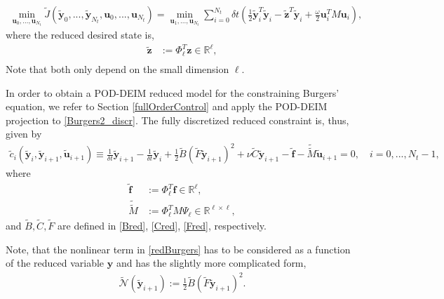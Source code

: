 \begin{align}
\label{redOpt}
\min_{\mathbf{u}_0,...,\mathbf{u}_{N_t}} \tilde{J}(\mathbf{\tilde y}_0,...,\mathbf{\tilde y}_{N_t},\mathbf{u}_0,...,\mathbf{u}_{N_t}) = \min_{\mathbf{u}_1,...,\mathbf{u}_{N_t}} \sum_{i=0}^{N_t} \delta \! t \left( \frac{1}{2} \mathbf{\tilde y}_i^T \mathbf{\tilde y}_i - \mathbf{\tilde z}^T\mathbf{\tilde y}_i + \frac{\omega}{2}\mathbf{u}_i^T M \mathbf{u}_i \right),
\end{align}
where the reduced desired state is,
\begin{align}
\label{zred}
\mathbf{\tilde z} &:= \Phi_\ell^T \mathbf{z} \in \mathbb{R}^\ell,\\
\end{align}
Note that both only depend on the small dimension $\ell$.

In order to obtain a POD-DEIM reduced model for the constraining Burgers' equation, we refer to Section \ref{fullOrderControl} and apply the POD-DEIM projection to \eqref{Burgers2_discr}. The fully discretized reduced constraint is, thus, given by
\begin{align}
\label{redBurgers}
\tilde{c}_i(\mathbf{\tilde y}_i,\mathbf{\tilde y}_{i+1},\mathbf{\tilde u}_{i+1}) \equiv \frac{1}{\delta \! t} \mathbf{\tilde y}_{i+1} - \frac{1}{\delta \! t}\mathbf{\tilde y}_i + \frac{1}{2} \tilde{B}(\tilde{F}\mathbf{\tilde y}_{i+1})^2 + \nu \tilde{C}\mathbf{\tilde y}_{i+1} - \mathbf{\tilde f} - \tilde{\tilde{M}}\mathbf{\tilde u}_{i+1} = 0, \quad i=0,...,N_t-1,
\end{align}
where
\begin{align}
\label{fred}
\mathbf{\tilde f} &:= \Phi_\ell^T \mathbf{f} \in \mathbb{R}^\ell,\\
\label{M1red}
\tilde{\tilde{M}} &:= \Phi_\ell^T M \Psi_\ell \in \mathbb{R}^{\ell \times \ell},
\end{align}
and $\tilde{B}, \tilde{C}, \tilde{F}$ are defined in \eqref{Bred}, \eqref{Cred}, \eqref{Fred}, respectively.

Note, that the nonlinear term in \eqref{redBurgers} has to be considered as a function of the reduced variable $\mathbf{y}$ and has the slightly more complicated form,
\begin{align}
 \label{redNonlin}
 \tilde{\mathcal{N}}(\mathbf{\tilde{y}}_{i+1}) := \frac{1}{2} \tilde{B} (\tilde{F} \mathbf{\tilde{y}}_{i+1})^2.
\end{align}

